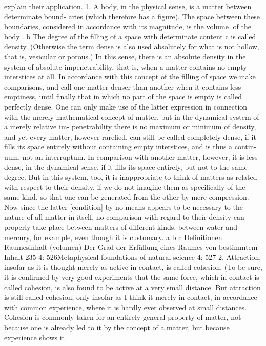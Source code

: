 explain their application.
1. A body, in the physical sense, is a matter between determinate bound-
aries (which therefore has a ﬁgure). The space between these boundaries,
considered in accordance with its magnitude, is the volume [of the body]. b
The degree of the ﬁlling of a space with determinate content c is called
density. (Otherwise the term dense is also used absolutely for what is not
hollow, that is, vesicular or porous.) In this sense, there is an absolute
density in the system of absolute impenetrability, that is, when a matter
contains no empty interstices at all. In accordance with this concept of
the ﬁlling of space we make comparisons, and call one matter denser
than another when it contains less emptiness, until ﬁnally that in which
no part of the space is empty is called perfectly dense. One can only make
use of the latter expression in connection with the merely mathematical
concept of matter, but in the dynamical system of a merely relative im-
penetrability there is no maximum or minimum of density, and yet every
matter, however rareﬁed, can still be called completely dense, if it ﬁlls its
space entirely without containing empty interstices, and is thus a contin-
uum, not an interruptum. In comparison with another matter, however,
it is less dense, in the dynamical sense, if it ﬁlls its space entirely, but not
to the same degree. But in this system, too, it is inappropriate to think
of matters as related with respect to their density, if we do not imagine
them as speciﬁcally of the same kind, so that one can be generated from
the other by mere compression. Now since the latter [condition] by no
means appears to be necessary to the nature of all matter in itself, no
comparison with regard to their density can properly take place between
matters of different kinds, between water and mercury, for example, even
though it is customary.
a
b
c
Deﬁnitionen
Raumesinhalt (volumen)
Der Grad der Erfüllung eines Raumes von bestimmtem Inhalt
235
4: 526Metaphysical foundations of natural science
4: 527
2. Attraction, insofar as it is thought merely as active in contact, is called
cohesion. (To be sure, it is conﬁrmed by very good experiments that the
same force, which in contact is called cohesion, is also found to be active at
a very small distance. But attraction is still called cohesion, only insofar as I
think it merely in contact, in accordance with common experience, where
it is hardly ever observed at small distances. Cohesion is commonly taken
for an entirely general property of matter, not because one is already
led to it by the concept of a matter, but because experience shows it
